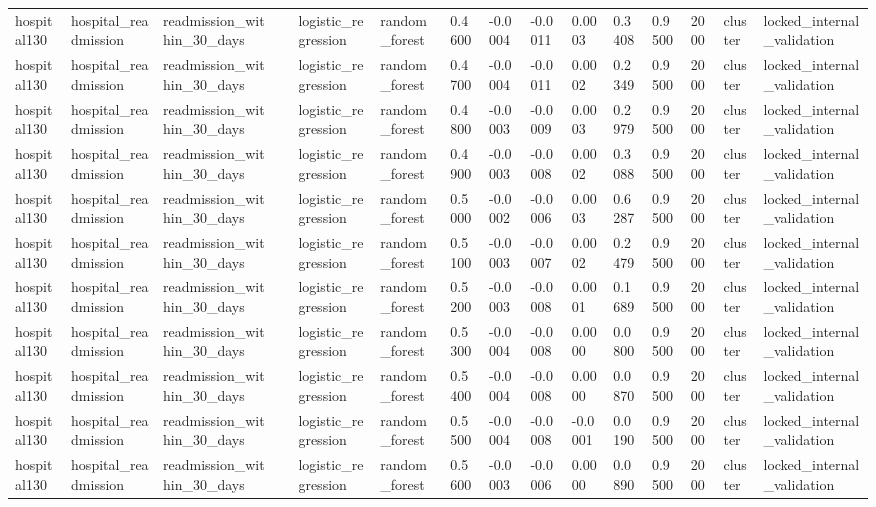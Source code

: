 \begin{tabular}{lllllllllllllll}
hospital130 & hospital\_readmission & readmission\_within\_30\_days &  & logistic\_regression & random\_forest & 0.4600 & -0.0004 & -0.0011 & 0.0003 & 0.3408 & 0.9500 & 2000 & cluster & locked\_internal\_validation \\
hospital130 & hospital\_readmission & readmission\_within\_30\_days &  & logistic\_regression & random\_forest & 0.4700 & -0.0004 & -0.0011 & 0.0002 & 0.2349 & 0.9500 & 2000 & cluster & locked\_internal\_validation \\
hospital130 & hospital\_readmission & readmission\_within\_30\_days &  & logistic\_regression & random\_forest & 0.4800 & -0.0003 & -0.0009 & 0.0003 & 0.2979 & 0.9500 & 2000 & cluster & locked\_internal\_validation \\
hospital130 & hospital\_readmission & readmission\_within\_30\_days &  & logistic\_regression & random\_forest & 0.4900 & -0.0003 & -0.0008 & 0.0002 & 0.3088 & 0.9500 & 2000 & cluster & locked\_internal\_validation \\
hospital130 & hospital\_readmission & readmission\_within\_30\_days &  & logistic\_regression & random\_forest & 0.5000 & -0.0002 & -0.0006 & 0.0003 & 0.6287 & 0.9500 & 2000 & cluster & locked\_internal\_validation \\
hospital130 & hospital\_readmission & readmission\_within\_30\_days &  & logistic\_regression & random\_forest & 0.5100 & -0.0003 & -0.0007 & 0.0002 & 0.2479 & 0.9500 & 2000 & cluster & locked\_internal\_validation \\
hospital130 & hospital\_readmission & readmission\_within\_30\_days &  & logistic\_regression & random\_forest & 0.5200 & -0.0003 & -0.0008 & 0.0001 & 0.1689 & 0.9500 & 2000 & cluster & locked\_internal\_validation \\
hospital130 & hospital\_readmission & readmission\_within\_30\_days &  & logistic\_regression & random\_forest & 0.5300 & -0.0004 & -0.0008 & 0.0000 & 0.0800 & 0.9500 & 2000 & cluster & locked\_internal\_validation \\
hospital130 & hospital\_readmission & readmission\_within\_30\_days &  & logistic\_regression & random\_forest & 0.5400 & -0.0004 & -0.0008 & 0.0000 & 0.0870 & 0.9500 & 2000 & cluster & locked\_internal\_validation \\
hospital130 & hospital\_readmission & readmission\_within\_30\_days &  & logistic\_regression & random\_forest & 0.5500 & -0.0004 & -0.0008 & -0.0001 & 0.0190 & 0.9500 & 2000 & cluster & locked\_internal\_validation \\
hospital130 & hospital\_readmission & readmission\_within\_30\_days &  & logistic\_regression & random\_forest & 0.5600 & -0.0003 & -0.0006 & 0.0000 & 0.0890 & 0.9500 & 2000 & cluster & locked\_internal\_validation \\

\end{tabular}

